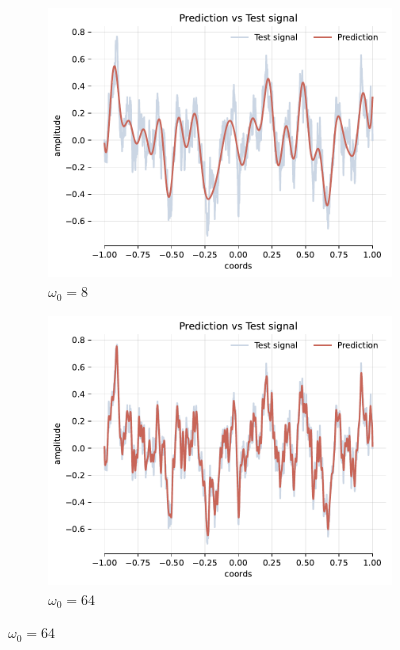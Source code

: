 \begin{figure}[h]
    \centering
    \begin{subfigure}[b]{0.32\textwidth}
        \centering
        \includegraphics[width=\textwidth]{img/ch4/pred-noise-h0-w8.pdf}
        \caption{$\omega_0=8$}
        \label{fig:rec-noise-shallow-w8}
    \end{subfigure}
    \hfill
    \begin{subfigure}[b]{0.32\textwidth}
        \centering
        \includegraphics[width=\textwidth]{img/ch4/pred-noise-h0-w64.pdf}
        \caption{$\omega_0=64$}
        \label{fig:rec-noise-shallow-w64}
    \end{subfigure}

\end{figure}

